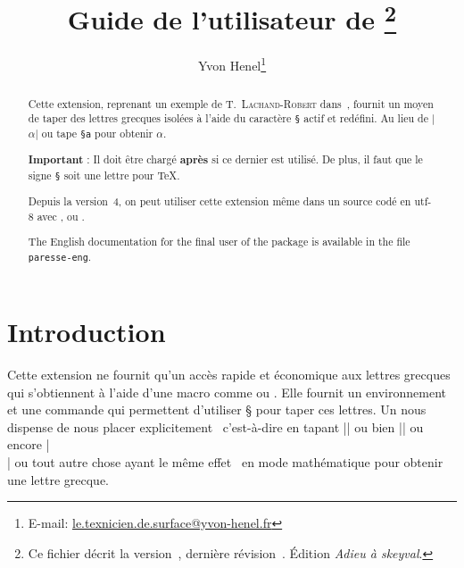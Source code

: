 \documentclass[full, french]{l3doc}
\newcommand*\PS{\texttt{\S}\xspace}
\newcommand*\PSVerb[1]{\texttt{\S #1}}
\newcommand{\TO}{\textemdash\ \ignorespaces}
\newcommand{\TF}{\unskip\ \textemdash\xspace}
\begin{document}
\title{Guide de l'utilisateur de \thanks{Ce fichier décrit la
    version~\ExplFileVersion, dernière révision~\ExplFileDate. Édition
    \emph{Adieu à skeyval}.}}
\author{Yvon Henel\thanks{E-mail:
    \href{mailto:le.texnicien.de.surface@yvon-henel.fr}
    {le.texnicien.de.surface@yvon-henel.fr}}}
\maketitle
\noindent\hrulefill

\begin{abstract}
  Cette extension, reprenant un exemple de T.~\textsc{Lachand-Robert}
  dans~\cite{tlachand}, fournit un moyen de taper des lettres grecques isolées
  à l'aide du caractère \PS actif et redéfini. Au lieu de |\(\alpha\)| ou tape
  \PSVerb{a} pour obtenir \(\alpha\).

  \textbf{Important} : Il doit être chargé \textbf{après}  si ce
  dernier est utilisé. De plus, il faut que le signe \PS soit une lettre pour
  \TeX.

  Depuis la version~4, on peut utiliser cette extension même dans un source
  codé en utf-8 avec ,  ou .
\end{abstract}

\noindent\hrulefill

 \begin{otherlanguage}{english}
\begin{abstract}
The English documentation for the final user of the package
 is available in the file \texttt{paresse-eng}.
\end{abstract}
\end{otherlanguage}

\noindent\hrulefill
\vspace{\baselineskip}

\tableofcontents{}

\section{Introduction}
\label{sec:introduction}

Cette extension ne fournit qu'un accès \og rapide et économique \fg aux lettres
grecques qui s'obtiennent à l'aide d'une macro comme  ou
. Elle fournit un environnement et une commande qui permettent
d'utiliser § pour taper ces lettres. Un  nous dispense de nous
placer explicitement \TO c'est-à-dire en tapant |$ $| ou bien |\( \)| ou encore
|\[ \]| ou tout autre chose ayant le même effet\TF en mode mathématique pour
obtenir une lettre grecque.
\end{document}
